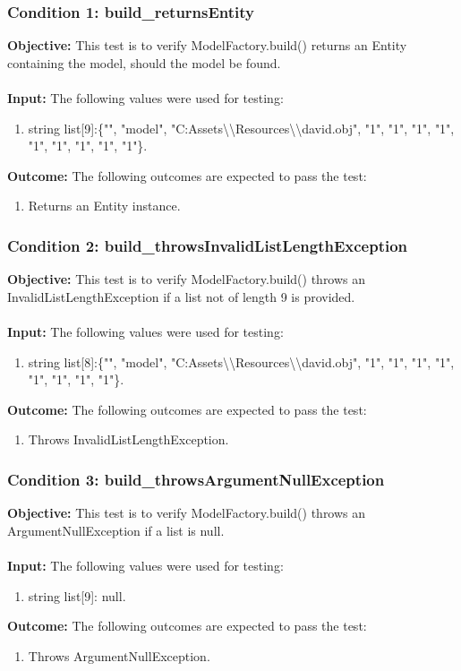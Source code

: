 \documentclass[a4paper,12pt]{article}
\begin{document}
		\subsubsection{Condition 1: build\_returnsEntity}
			\textbf{Objective:} This test is to verify  ModelFactory.build() returns an Entity containing the model, should the model be found.\\\\
			\textbf{Input:} The following values were used for testing:
				\begin{enumerate}
					\item string list[9]:\{"", "model", "C:Assets\textbackslash \textbackslash Resources\textbackslash \textbackslash david.obj", "1", "1", "1", "1", "1", "1", "1", "1", "1"\}.
				\end{enumerate}
			\textbf{Outcome:} The following outcomes are expected to pass the test:
				\begin{enumerate}
					\item Returns an Entity instance.
				\end{enumerate}
		\subsubsection{Condition 2: build\_throwsInvalidListLengthException}
			\textbf{Objective:} This test is to verify  ModelFactory.build() throws an InvalidListLengthException if a list not of length 9 is provided.\\\\
			\textbf{Input:} The following values were used for testing:
				\begin{enumerate}
					\item string list[8]:\{"", "model", "C:Assets\textbackslash \textbackslash Resources\textbackslash \textbackslash david.obj", "1", "1", "1", "1", "1", "1", "1", "1"\}.
				\end{enumerate}
			\textbf{Outcome:} The following outcomes are expected to pass the test:
				\begin{enumerate}
					\item Throws InvalidListLengthException.
				\end{enumerate}
		\subsubsection{Condition 3: build\_throwsArgumentNullException}
			\textbf{Objective:} This test is to verify  ModelFactory.build() throws an ArgumentNullException if a list is null.\\\\
			\textbf{Input:} The following values were used for testing:
				\begin{enumerate}
					\item string list[9]: null.
				\end{enumerate}
			\textbf{Outcome:} The following outcomes are expected to pass the test:
				\begin{enumerate}
					\item Throws ArgumentNullException.
				\end{enumerate}
\end{document}
